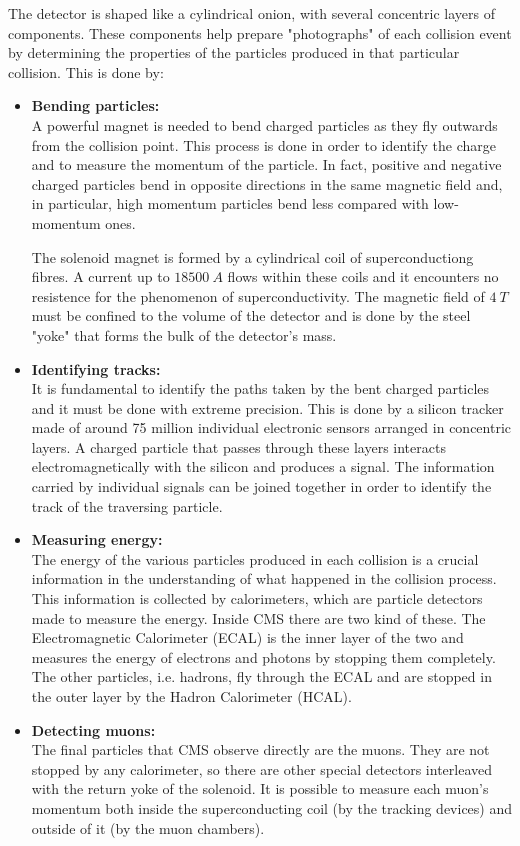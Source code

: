 The detector is shaped like a cylindrical onion, with several concentric layers of components. These components help prepare "photographs" of each collision event by determining the properties of the particles produced in that particular collision. This is done by:
\begin{itemize}
	\item \textbf{Bending particles:}\\
	A powerful magnet is needed to bend charged particles as they fly outwards from the collision point. This process is done in order to identify the charge and to measure the momentum of the particle. In fact, positive and negative charged particles bend in opposite directions in the same magnetic field and, in particular, high momentum particles bend less compared with low-momentum ones.
	
	The solenoid magnet is formed by a cylindrical coil of superconductiong fibres. A current up to $18500~\si{A}$ flows within these coils and it encounters no resistence for the phenomenon of superconductivity. The magnetic field of $4~\si{T}$ must be confined to the volume of the detector and is done by the steel "yoke" that forms the bulk of the detector's mass.
	
	\item \textbf{Identifying tracks:}\\
	It is fundamental to identify the paths taken by the bent charged particles and it must be done with extreme precision. This is done by a silicon tracker made of around 75 million individual electronic sensors arranged in concentric layers. A charged particle that passes through these layers interacts electromagnetically with the silicon and produces a signal. The information carried by individual signals can be joined together in order to identify the track of the traversing particle.
	
	\item \textbf{Measuring energy:}\\
	The energy of the various particles produced in each collision is a crucial information in the understanding of what happened in the collision process. This information is collected by calorimeters, which are particle detectors made to measure the energy. Inside CMS there are two kind of these. The Electromagnetic Calorimeter (ECAL) is the inner layer of the two and measures the energy of electrons and photons by stopping them completely. The other particles, i.e. hadrons, fly through the ECAL and are stopped in the outer layer by the Hadron Calorimeter (HCAL).
	
	\item \textbf{Detecting muons:}\\
	The final particles that CMS observe directly are the muons. They are not stopped by any calorimeter, so there are other special detectors interleaved with the return yoke of the solenoid. It is possible to measure each muon's momentum both inside the superconducting coil (by the tracking devices) and outside of it (by the muon chambers).
\end{itemize}

